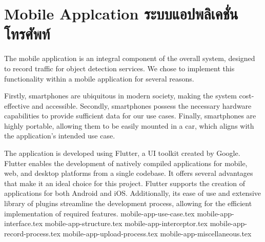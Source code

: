 \section{\ifenglish Mobile Applcation \else ระบบแอปพลิเคชั่นโทรศัพท์ \fi}
The mobile application is an integral component of the overall system, designed to record traffic for object detection services. We chose to implement this functionality within a mobile application for several reasons. 

Firstly, smartphones are ubiquitous in modern society, making the system cost-effective and accessible. Secondly, smartphones possess the necessary hardware capabilities to provide sufficient data for our use cases. Finally, smartphones are highly portable, allowing them to be easily mounted in a car, which aligns with the application's intended use case.

The application is developed using Flutter, a UI toolkit created by Google. Flutter enables the development of natively compiled applications for mobile, web, and desktop platforms from a single codebase. It offers several advantages that make it an ideal choice for this project. Flutter supports the creation of applications for both Android and iOS. Additionally, its ease of use and extensive library of plugins streamline the development process, allowing for the efficient implementation of required features.
\newcommand{\dir}{chapters/approach/mobile-app}
{mobile-app-use-case.tex}
{mobile-app-interface.tex}
{mobile-app-structure.tex}
{mobile-app-interceptor.tex}
{mobile-app-record-process.tex}
{mobile-app-upload-process.tex}
{mobile-app-miscellaneous.tex}
